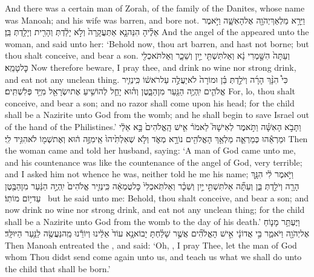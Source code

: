 {And there was a certain man of Zorah, of the family of the Danites, whose name was Manoah; and his wife was barren, and bore not.}
{וַיֵּרָ֥א מַלְאַךְ\maqqaf יְהֹוָ֖ה אֶל\maqqaf הָאִשָּׁ֑ה וַיֹּ֣אמֶר אֵלֶ֗יהָ הִנֵּה\maqqaf נָ֤א אַתְּ\maqqaf עֲקָרָה֙ וְלֹ֣א יָלַ֔דְתְּ וְהָרִ֖ית וְיָלַ֥דְתְּ בֵּֽן׃}
{And the angel of the \lord\space appeared unto the woman, and said unto her: ‘Behold now, thou art barren, and hast not borne; but thou shalt conceive, and bear a son.}
{וְעַתָּה֙ הִשָּׁ֣מְרִי נָ֔א וְאַל\maqqaf תִּשְׁתִּ֖י יַ֣יִן וְשֵׁכָ֑ר וְאַל\maqqaf תֹּאכְלִ֖י כׇּל\maqqaf טָמֵֽא׃}
{Now therefore beware, I pray thee, and drink no wine nor strong drink, and eat not any unclean thing.}
{כִּי֩ הִנָּ֨ךְ הָרָ֜ה וְיֹלַ֣דְתְּ בֵּ֗ן וּמוֹרָה֙ לֹא\maqqaf יַעֲלֶ֣ה עַל\maqqaf רֹאשׁ֔וֹ כִּֽי\maqqaf נְזִ֧יר אֱלֹהִ֛ים יִֽהְיֶ֥ה הַנַּ֖עַר מִן\maqqaf הַבָּ֑טֶן וְה֗וּא יָחֵ֛ל לְהוֹשִׁ֥יעַ אֶת\maqqaf יִשְׂרָאֵ֖ל מִיַּ֥ד פְּלִשְׁתִּֽים׃}
{For, lo, thou shalt conceive, and bear a son; and no razor shall come upon his head; for the child shall be a Nazirite unto God from the womb; and he shall begin to save Israel out of the hand of the Philistines.’}
{וַתָּבֹ֣א הָאִשָּׁ֗ה וַתֹּ֣אמֶר לְאִישָׁהּ֮ לֵאמֹר֒ אִ֤ישׁ הָֽאֱלֹהִים֙ בָּ֣א אֵלַ֔י וּמַרְאֵ֕הוּ כְּמַרְאֵ֛ה מַלְאַ֥ךְ הָאֱלֹהִ֖ים נוֹרָ֣א מְאֹ֑ד וְלֹ֤א שְׁאִלְתִּ֙יהוּ֙ אֵֽי\maqqaf מִזֶּ֣ה ה֔וּא וְאֶת\maqqaf שְׁמ֖וֹ לֹא\maqqaf הִגִּ֥יד לִֽי׃}
{Then the woman came and told her husband, saying: ‘A man of God came unto me, and his countenance was like the countenance of the angel of God, very terrible; and I asked him not whence he was, neither told he me his name;}
{וַיֹּ֣אמֶר לִ֔י הִנָּ֥ךְ הָרָ֖ה וְיֹלַ֣דְתְּ בֵּ֑ן וְעַתָּ֞ה אַל\maqqaf תִּשְׁתִּ֣י \legarmeh  יַ֣יִן וְשֵׁכָ֗ר וְאַל\maqqaf תֹּֽאכְלִי֙ כׇּל\maqqaf טֻמְאָ֔ה כִּֽי\maqqaf נְזִ֤יר אֱלֹהִים֙ יִֽהְיֶ֣ה הַנַּ֔עַר מִן\maqqaf הַבֶּ֖טֶן עַד\maqqaf י֥וֹם מוֹתֽוֹ׃ \petucha }
{but he said unto me: Behold, thou shalt conceive, and bear a son; and now drink no wine nor strong drink, and eat not any unclean thing; for the child shall be a Nazirite unto God from the womb to the day of his death.’}
{וַיֶּעְתַּ֥ר מָנ֛וֹחַ אֶל\maqqaf יְהֹוָ֖ה וַיֹּאמַ֑ר בִּ֣י אֲדוֹנָ֔י אִ֣ישׁ הָאֱלֹהִ֞ים אֲשֶׁ֣ר שָׁלַ֗חְתָּ יָבוֹא\maqqaf נָ֥א עוֹד֙ אֵלֵ֔ינוּ וְיוֹרֵ֕נוּ מַֽה\maqqaf נַּעֲשֶׂ֖ה לַנַּ֥עַר הַיּוּלָּֽד׃}
{Then Manoah entreated the \lord, and said: ‘Oh, \lord, I pray Thee, let the man of God whom Thou didst send come again unto us, and teach us what we shall do unto the child that shall be born.’}
